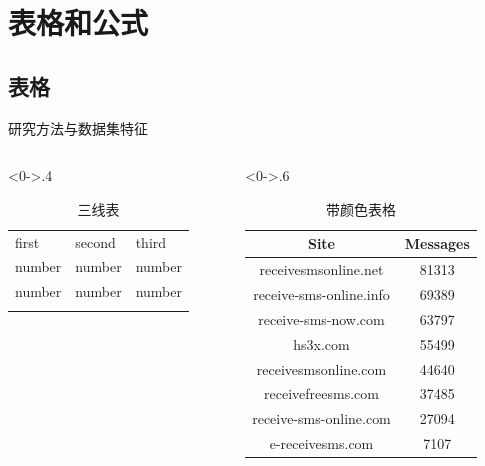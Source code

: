 \documentclass[10pt,aspectratio=43,mathserif,table]{beamer}
\begin{document}
\section{表格和公式}
\subsection{表格}
\begin{frame}{研究方法与数据集特征}
\begin{columns}[c] %
	\begin{column}<0->{.4\textwidth}
		\begin{table}\footnotesize
			\caption{三线表}
			\label{tab:1}       %
			\begin{tabular}{lll}
			\hline\noalign{\smallskip}
			first & second & third  \\
			\noalign{\smallskip}\hline\noalign{\smallskip}
			number & number & number \\
			number & number & number \\
			\noalign{\smallskip}\hline
			\end{tabular}
			\end{table}
    \end{column}%
\hfill%
	\begin{column}<0->{.6\textwidth}
		\begin{table}
			\caption{带颜色表格}
			\footnotesize
			\begin{tabular}{|c|c|}
				\hline
				\textbf{Site}           & \textbf{Messages}\\
				\hline
				receivesmsonline.net    &81313\\
				\hline
				receive-sms-online.info &69389\\
				\hline
				receive-sms-now.com     &63797\\
				\hline
				hs3x.com               &55499\\
				\hline
				receivesmsonline.com    &44640\\
				\hline
				receivefreesms.com      &37485\\
				\hline
				receive-sms-online.com  &27094\\
				\hline
				e-receivesms.com       &7107\\
				\hline
			\end{tabular}
		\end{table}
    \end{column}%
\end{columns}
\end{frame}
\end{document}
